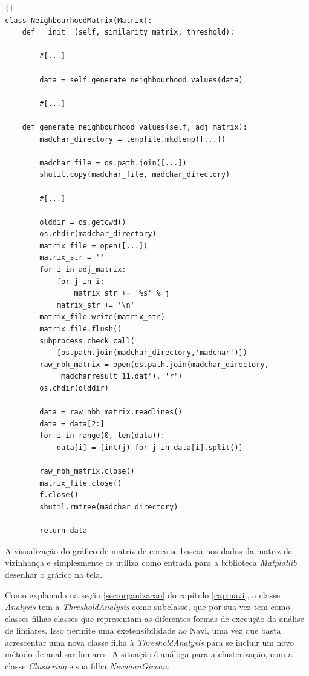 \lstset{language=python}
\lstset{commentstyle=\textit}
\begin{lstlisting}[frame=trbl, caption=Geração de Matriz de Adjacências,label=lst:gennbhvalues]{}
class NeighbourhoodMatrix(Matrix):
    def __init__(self, similarity_matrix, threshold):
        
        #[...]
                    
        data = self.generate_neighbourhood_values(data)
                    
        #[...]
        
    def generate_neighbourhood_values(self, adj_matrix):
        madchar_directory = tempfile.mkdtemp([...])
        
        madchar_file = os.path.join([...])
        shutil.copy(madchar_file, madchar_directory)
        
        #[...]
        
        olddir = os.getcwd()
        os.chdir(madchar_directory)
        matrix_file = open([...])
        matrix_str = ''
        for i in adj_matrix:
            for j in i:
                matrix_str += '%s' % j
            matrix_str += '\n'
        matrix_file.write(matrix_str)
        matrix_file.flush()
        subprocess.check_call(
            [os.path.join(madchar_directory,'madchar')])
        raw_nbh_matrix = open(os.path.join(madchar_directory,
            'madcharresult_11.dat'), 'r')
        os.chdir(olddir)
        
        data = raw_nbh_matrix.readlines()
        data = data[2:]
        for i in range(0, len(data)):
            data[i] = [int(j) for j in data[i].split()]
        
        raw_nbh_matrix.close()
        matrix_file.close()
        f.close()
        shutil.rmtree(madchar_directory)
        
        return data
\end{lstlisting}

A visualização do gráfico de matriz de cores se baseia nos dados da matriz de vizinhança e simplesmente os utiliza como entrada para a biblioteca
\textit{Matplotlib} desenhar o gráfico na tela.

Como explanado na seção \ref{sec:organizacao} do capítulo \ref{cap:navi}, a classe \textit{Analysis} tem a \textit{ThresholdAnalysis} como subclasse,
que por sua vez tem como classes filhas classes que representam as diferentes formas de execução da análise de limiares. Isso permite uma exetensibilidade
ao Navi, uma vez que basta acrescentar uma nova classe filha à \textit{ThresholdAnalysis} para se incluir um novo método de analisar limiares. A situação
é análoga para a clusterização, com a classe \textit{Clustering} e sua filha \textit{NewmanGirvan}.

